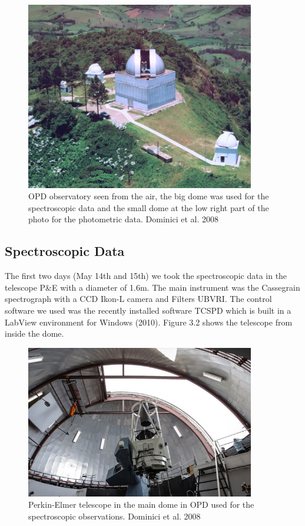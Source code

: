 \begin{figure}[H]
\centering
\includegraphics[width=10cm]{images/opd.jpg}
\caption[OPD Observatory]{OPD observatory seen from the air, the big dome was used for the spectroscopic data and the small dome at the low right part of the photo for the photometric data. Dominici et al. 2008}
\end{figure}

\subsection{Spectroscopic Data}

The first two days (May 14th and 15th) we took the spectroscopic data in the telescope P\&E with a diameter of 1.6m. The main instrument was the Cassegrain spectrograph with a CCD Ikon-L camera and Filters UBVRI. The control software we used was the recently installed software TCSPD which is built in a LabView environment for Windows (2010). Figure 3.2 shows the telescope from inside the dome.

\begin{figure}[H]
\centering
\includegraphics[width=10cm]{images/opd-spectrograph.jpg}
\caption[Perkin-Elmer telescope used for Spectroscopy]{Perkin-Elmer telescope in the main dome in OPD used for the spectroscopic observations. Dominici et al. 2008}
\end{figure}

